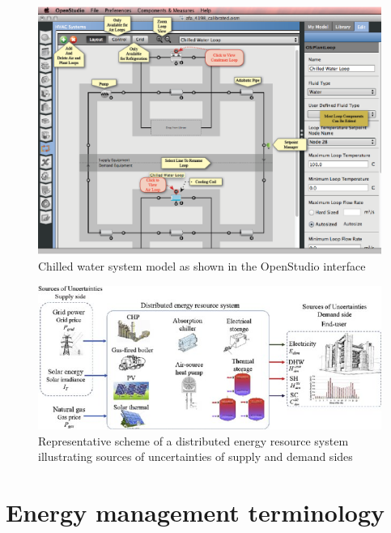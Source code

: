\documentclass[10pt]{article}
\begin{document}
            \begin{figure}[h]
            \centering
            \includegraphics[width=13cm]{extras29/OS-supply-demand.png}
            \caption{Chilled water system model as shown in the OpenStudio interface \cite{OSdocs}}
            \label{os-s-d}
            \end{figure}
            
                        \begin{figure}[h]
            \centering
            \includegraphics[width=15cm]{extras29/uncertainty-supply-demand.jpg}
            \caption{Representative scheme of a distributed energy resource system illustrating sources of uncertainties of supply and demand sides  \cite{Di_Somma2018-fa}}
            \label{u-s-d}
            \end{figure}




\section{Energy management terminology}
\end{document}
